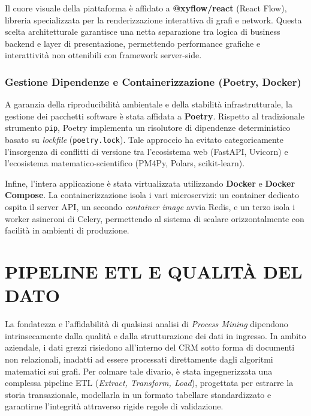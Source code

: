 \documentclass[12pt, a4paper]{report}
\begin{document}
Il cuore visuale della piattaforma è affidato a \textbf{@xyflow/react} (React Flow), libreria specializzata per la renderizzazione interattiva di grafi e network. Questa scelta architetturale garantisce una netta separazione tra logica di business backend e layer di presentazione, permettendo performance grafiche e interattività non ottenibili con framework server-side.

\subsection{Gestione Dipendenze e Containerizzazione (Poetry, Docker)}
A garanzia della riproducibilità ambientale e della stabilità infrastrutturale, la gestione dei pacchetti software è stata affidata a \textbf{Poetry}. Rispetto al tradizionale strumento \texttt{pip}, Poetry implementa un risolutore di dipendenze deterministico basato su \textit{lockfile} (\texttt{poetry.lock}). Tale approccio ha evitato categoricamente l'insorgenza di conflitti di versione tra l'ecosistema web (FastAPI, Uvicorn) e l'ecosistema matematico-scientifico (PM4Py, Polars, scikit-learn).

Infine, l'intera applicazione è stata virtualizzata utilizzando \textbf{Docker} e \textbf{Docker Compose}. La containerizzazione isola i vari microservizi: un container dedicato ospita il server API, un secondo \textit{container image} avvia Redis, e un terzo isola i worker asincroni di Celery, permettendo al sistema di scalare orizzontalmente con facilità in ambienti di produzione.

\chapter{PIPELINE ETL E QUALITÀ DEL DATO}

La fondatezza e l'affidabilità di qualsiasi analisi di \textit{Process Mining} dipendono intrinsecamente dalla qualità e dalla strutturazione dei dati in ingresso. In ambito aziendale, i dati grezzi risiedono all'interno del CRM sotto forma di documenti non relazionali, inadatti ad essere processati direttamente dagli algoritmi matematici sui grafi. Per colmare tale divario, è stata ingegnerizzata una complessa pipeline ETL (\textit{Extract, Transform, Load}), progettata per estrarre la storia transazionale, modellarla in un formato tabellare standardizzato e garantirne l'integrità attraverso rigide regole di validazione.
\end{document}
